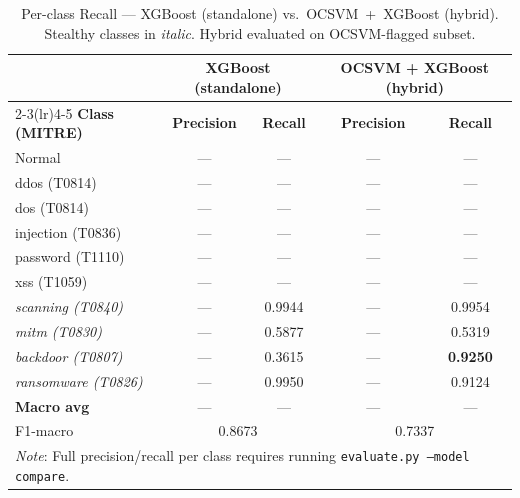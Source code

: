 \begin{table}[!t]
\renewcommand{\arraystretch}{1.2}
\caption{Per-class Recall — XGBoost (standalone) vs.\ OCSVM~+~XGBoost (hybrid).
Stealthy classes in \textit{italic}. Hybrid evaluated on OCSVM-flagged subset.}
\label{tab:per_class}
\centering
\footnotesize
\begin{tabular}{lcccc}
\toprule
 & \multicolumn{2}{c}{\textbf{XGBoost (standalone)}} &
   \multicolumn{2}{c}{\textbf{OCSVM + XGBoost (hybrid)}} \\
\cmidrule(lr){2-3}\cmidrule(lr){4-5}
\textbf{Class (MITRE)} & \textbf{Precision} & \textbf{Recall} &
                         \textbf{Precision} & \textbf{Recall} \\
\midrule
Normal                         & ---  & ---    & ---  & ---    \\
ddos (T0814)                   & ---  & ---    & ---  & ---    \\
dos (T0814)                    & ---  & ---    & ---  & ---    \\
injection (T0836)              & ---  & ---    & ---  & ---    \\
password (T1110)               & ---  & ---    & ---  & ---    \\
xss (T1059)                    & ---  & ---    & ---  & ---    \\
\textit{scanning (T0840)}      & ---  & 0.9944 & ---  & 0.9954 \\
\textit{mitm (T0830)}          & ---  & 0.5877 & ---  & 0.5319 \\
\textit{backdoor (T0807)}      & ---  & 0.3615 & ---  & \textbf{0.9250} \\
\textit{ransomware (T0826)}    & ---  & 0.9950 & ---  & 0.9124 \\
\midrule
\textbf{Macro avg}             & ---  & ---    & ---  & ---    \\
F1-macro                       & \multicolumn{2}{c}{0.8673} &
                                 \multicolumn{2}{c}{0.7337} \\
\midrule
\multicolumn{5}{l}{\textit{Note}: Full precision/recall per class requires running
\texttt{evaluate.py --model compare}.} \\
\bottomrule
\end{tabular}
\end{table}
